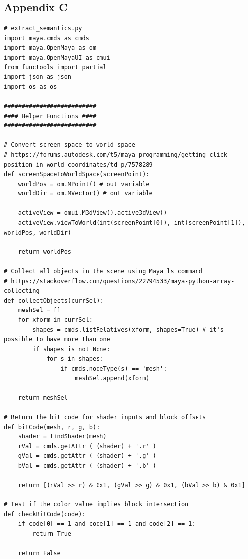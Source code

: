 \documentclass[conference]{IEEEtran}
\begin{document}
{{\pagebreak

\begin{center}
\section*{Appendix C}
\label{app:b}
\end{center}

\bigskip

\begin{verbatim}
# extract_semantics.py
import maya.cmds as cmds
import maya.OpenMaya as om
import maya.OpenMayaUI as omui
from functools import partial
import json as json
import os as os

##########################
#### Helper Functions ####
##########################

# Convert screen space to world space
# https://forums.autodesk.com/t5/maya-programming/getting-click-position-in-world-coordinates/td-p/7578289
def screenSpaceToWorldSpace(screenPoint):
    worldPos = om.MPoint() # out variable
    worldDir = om.MVector() # out variable
    
    activeView = omui.M3dView().active3dView()
    activeView.viewToWorld(int(screenPoint[0]), int(screenPoint[1]), worldPos, worldDir)
    
    return worldPos

# Collect all objects in the scene using Maya ls command
# https://stackoverflow.com/questions/22794533/maya-python-array-collecting
def collectObjects(currSel):
    meshSel = []
    for xform in currSel:
        shapes = cmds.listRelatives(xform, shapes=True) # it's possible to have more than one
        if shapes is not None:
            for s in shapes:
                if cmds.nodeType(s) == 'mesh':
                    meshSel.append(xform)
  
    return meshSel
    
# Return the bit code for shader inputs and block offsets
def bitCode(mesh, r, g, b):
    shader = findShader(mesh)
    rVal = cmds.getAttr ( (shader) + '.r' )
    gVal = cmds.getAttr ( (shader) + '.g' )
    bVal = cmds.getAttr ( (shader) + '.b' ) 
    
    return [(rVal >> r) & 0x1, (gVal >> g) & 0x1, (bVal >> b) & 0x1]

# Test if the color value implies block intersection
def checkBitCode(code):
    if code[0] == 1 and code[1] == 1 and code[2] == 1:
        return True
        
    return False


\end{verbatim}}}
\end{document}
